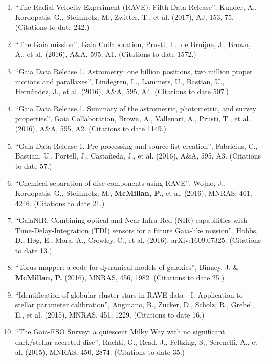 \documentclass{resume}
\begin{document}
\begin{enumerate}
\item ``The Radial Velocity Experiment (RAVE): Fifth Data Release'', Kunder, A., Kordopatis, G., Steinmetz, M., Zwitter, T., et al. (2017), AJ, 153, 75. (Citations to date 242.)

\item ``The Gaia mission'', Gaia Collaboration, Prusti, T., de Bruijne, J., Brown, A., et al. (2016), A\&A, 595, A1. (Citations to date 1572.)

\item ``Gaia Data Release 1. Astrometry: one billion positions, two million proper motions and parallaxes'', Lindegren, L., Lammers, U., Bastian, U., Hern\'andez, J., et al. (2016), A\&A, 595, A4. (Citations to date 507.)

\item ``Gaia Data Release 1. Summary of the astrometric, photometric, and survey properties'', Gaia Collaboration, Brown, A., Vallenari, A., Prusti, T., et al. (2016), A\&A, 595, A2. (Citations to date 1149.)

\item ``Gaia Data Release 1. Pre-processing and source list creation'', Fabricius, C., Bastian, U., Portell, J., Casta\~neda, J., et al. (2016), A\&A, 595, A3. (Citations to date 57.)

\item ``Chemical separation of disc components using RAVE'', Wojno, J., Kordopatis, G., Steinmetz, M., \textbf{McMillan, P.}, et al. (2016), MNRAS, 461, 4246. (Citations to date 21.)

\item ``GaiaNIR: Combining optical and Near-Infra-Red (NIR) capabilities with Time-Delay-Integration (TDI) sensors for a future Gaia-like mission'', Hobbs, D., H{\o}g, E., Mora, A., Crowley, C., et al. (2016), arXiv:1609.07325. (Citations to date 13.)

\item ``Torus mapper: a code for dynamical models of galaxies'', Binney, J. \& \textbf{McMillan, P.} (2016), MNRAS, 456, 1982. (Citations to date 25.)

\item ``Identification of globular cluster stars in RAVE data - I. Application to stellar parameter calibration'', Anguiano, B., Zucker, D., Scholz, R., Grebel, E., et al. (2015), MNRAS, 451, 1229. (Citations to date 16.)

\item ``The Gaia-ESO Survey: a quiescent Milky Way with no significant dark/stellar accreted disc'', Ruchti, G., Read, J., Feltzing, S., Serenelli, A., et al. (2015), MNRAS, 450, 2874. (Citations to date 35.)


\end{enumerate}
\end{document}
